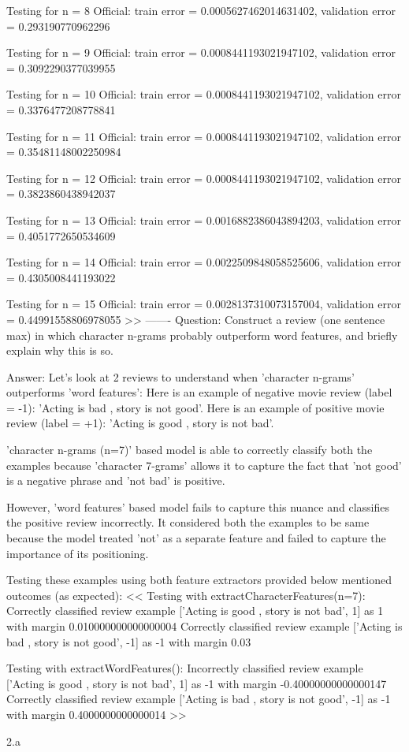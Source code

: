 \begin{answer}
Testing for n = 8
Official: train error = 0.0005627462014631402, validation error = 0.293190770962296

Testing for n = 9
Official: train error = 0.0008441193021947102, validation error = 0.3092290377039955

Testing for n = 10
Official: train error = 0.0008441193021947102, validation error = 0.3376477208778841

Testing for n = 11
Official: train error = 0.0008441193021947102, validation error = 0.35481148002250984

Testing for n = 12
Official: train error = 0.0008441193021947102, validation error = 0.3823860438942037

Testing for n = 13
Official: train error = 0.0016882386043894203, validation error = 0.4051772650534609

Testing for n = 14
Official: train error = 0.0022509848058525606, validation error = 0.4305008441193022

Testing for n = 15
Official: train error = 0.0028137310073157004, validation error = 0.44991558806978055
>>
-------
Question: Construct a review (one sentence max) in which character n-grams probably outperform word features, and
briefly explain why this is so.

Answer: Let's look at 2 reviews to understand when 'character n-grams' outperforms 'word features':
Here is an example of negative movie review (label = -1): 'Acting is bad , story is not good'.
Here is an example of positive movie review (label = +1): 'Acting is good , story is not bad'.

'character n-grams (n=7)' based model is able to correctly classify both the examples
because 'character 7-grams' allows it to capture the fact that 'not good' is a negative phrase and 'not bad' is positive.

However, 'word features' based model fails to capture this nuance and classifies the positive review incorrectly. It
considered both the examples to be same because the model treated 'not' as a separate feature and failed to capture the
importance of its positioning.

Testing these examples using both feature extractors provided below mentioned outcomes (as expected):
<<
Testing with extractCharacterFeatures(n=7):
Correctly classified review example ['Acting is good , story is not bad', 1] as 1 with margin 0.010000000000000004
Correctly classified review example ['Acting is bad , story is not good', -1] as -1 with margin 0.03

Testing with extractWordFeatures():
Incorrectly classified review example ['Acting is good , story is not bad', 1] as -1 with margin -0.40000000000000147
Correctly classified review example ['Acting is bad , story is not good', -1] as -1 with margin 0.4000000000000014
>>
\end{answer}
\clearpage

\LARGE
2.a
\normalsize

\begin{answer}
\end{answer}
\clearpage


